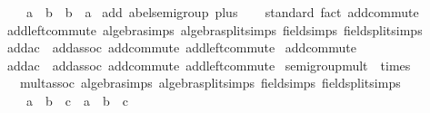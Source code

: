 \begin{isabellebody}
\ \ \ \ {\isachardoublequoteopen}a\ {\isacharplus}{\kern0pt}\ b\ {\isacharequal}{\kern0pt}\ b\ {\isacharplus}{\kern0pt}\ a{\isachardoublequoteclose}\isanewline
{}\isanewline
\isanewline
{}\isamarkupfalse%
\ add{\isacharcolon}{\kern0pt}\ abel{\isacharunderscore}{\kern0pt}semigroup\ plus\isanewline
%
\isadelimproof
\ \ %
\endisadelimproof
%
\isatagproof
{}\isamarkupfalse%
\ standard\ {\isacharparenleft}{\kern0pt}fact\ add{\isacharunderscore}{\kern0pt}commute{\isacharparenright}{\kern0pt}%
\endisatagproof
{\isafoldproof}%
%
\isadelimproof
\isanewline
%
\endisadelimproof
\isanewline
{}\isamarkupfalse%
\ add{\isachardot}{\kern0pt}left{\isacharunderscore}{\kern0pt}commute\ {\isacharbrackleft}{\kern0pt}algebra{\isacharunderscore}{\kern0pt}simps{\isacharcomma}{\kern0pt}\ algebra{\isacharunderscore}{\kern0pt}split{\isacharunderscore}{\kern0pt}simps{\isacharcomma}{\kern0pt}\ field{\isacharunderscore}{\kern0pt}simps{\isacharcomma}{\kern0pt}\ field{\isacharunderscore}{\kern0pt}split{\isacharunderscore}{\kern0pt}simps{\isacharbrackright}{\kern0pt}\isanewline
\isanewline
{}\isamarkupfalse%
\ add{\isacharunderscore}{\kern0pt}ac\ {\isacharequal}{\kern0pt}\ add{\isachardot}{\kern0pt}assoc\ add{\isachardot}{\kern0pt}commute\ add{\isachardot}{\kern0pt}left{\isacharunderscore}{\kern0pt}commute\isanewline
\isanewline
{}\isamarkupfalse%
\isanewline
\isanewline
{}\isamarkupfalse%
\ add{\isacharunderscore}{\kern0pt}commute\isanewline
\isanewline
{}\isamarkupfalse%
\ add{\isacharunderscore}{\kern0pt}ac\ {\isacharequal}{\kern0pt}\ add{\isachardot}{\kern0pt}assoc\ add{\isachardot}{\kern0pt}commute\ add{\isachardot}{\kern0pt}left{\isacharunderscore}{\kern0pt}commute\isanewline
\isanewline
{}\isamarkupfalse%
\ semigroup{\isacharunderscore}{\kern0pt}mult\ {\isacharequal}{\kern0pt}\ times\ {\isacharplus}{\kern0pt}\isanewline
\ \ \ mult{\isacharunderscore}{\kern0pt}assoc\ {\isacharbrackleft}{\kern0pt}algebra{\isacharunderscore}{\kern0pt}simps{\isacharcomma}{\kern0pt}\ algebra{\isacharunderscore}{\kern0pt}split{\isacharunderscore}{\kern0pt}simps{\isacharcomma}{\kern0pt}\ field{\isacharunderscore}{\kern0pt}simps{\isacharcomma}{\kern0pt}\ field{\isacharunderscore}{\kern0pt}split{\isacharunderscore}{\kern0pt}simps{\isacharbrackright}{\kern0pt}{\isacharcolon}{\kern0pt}\isanewline
\ \ \ \ {\isachardoublequoteopen}{\isacharparenleft}{\kern0pt}a\ {\isacharasterisk}{\kern0pt}\ b{\isacharparenright}{\kern0pt}\ {\isacharasterisk}{\kern0pt}\ c\ {\isacharequal}{\kern0pt}\ a\ {\isacharasterisk}{\kern0pt}\ {\isacharparenleft}{\kern0pt}b\ {\isacharasterisk}{\kern0pt}\ c{\isacharparenright}{\kern0pt}{\isachardoublequoteclose}\isanewline

\end{isabellebody}

